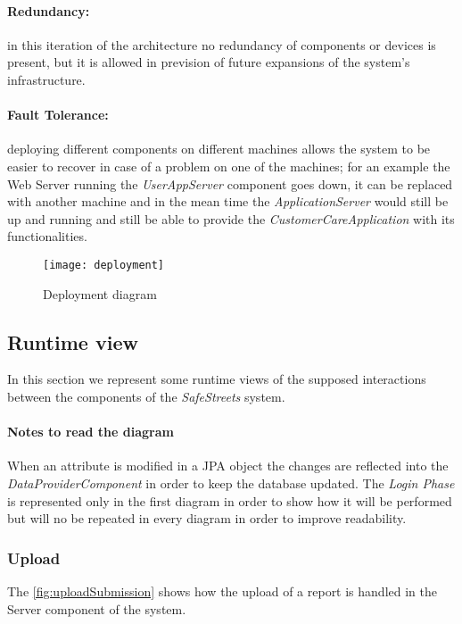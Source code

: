\paragraph{Redundancy:}in this iteration of the architecture no redundancy of components or devices is present, but it is allowed in prevision of future expansions of the system's infrastructure.
\paragraph{Fault Tolerance:}deploying different components on different machines allows the system to be easier to recover in case of a problem on one of the machines; for an example the Web Server running the \textit{UserAppServer} component goes down, it can be replaced with another machine and in the mean time the \textit{ApplicationServer} would still be up and running and still be able to provide the \textit{CustomerCareApplication} with its functionalities.
\clearpage

\begin{figure}[t!]
	\centering
	\texttt{[image: deployment]}
	\caption{
		\label{fig:deployment} 
		Deployment diagram
	}
\end{figure}

\clearpage
\subsection{Runtime view}
In this section we represent some runtime views of the supposed interactions between the components of the \emph{SafeStreets} system.

\paragraph{Notes to read the diagram} When an attribute is modified in a JPA object the changes are reflected into the
	\emph{DataProviderComponent} in order to keep the database updated. 
	The \emph{Login Phase} is represented only in the first diagram in order to show how it will be performed but will no be 
	repeated in every diagram in order to improve readability.

\subsubsection{Upload}

	\label{sec:uploadRunView}
	The \autoref{fig:uploadSubmission} shows how the upload of a report is handled in the Server component of the system.

